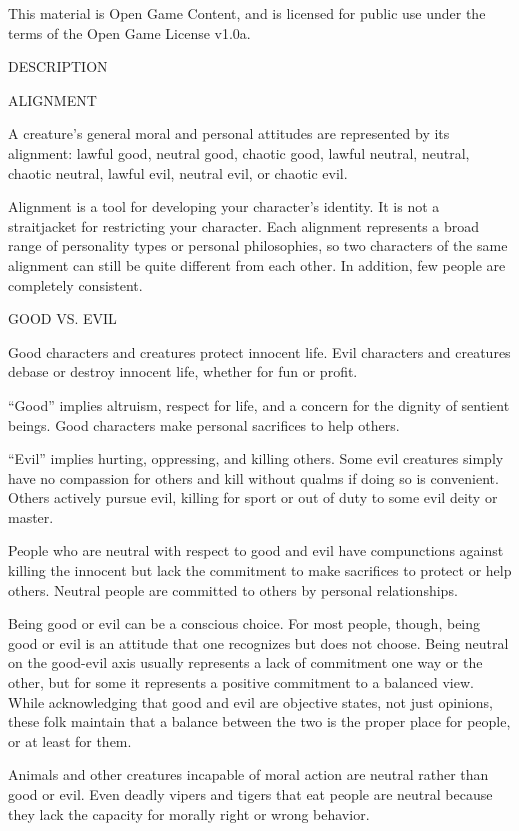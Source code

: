 \documentclass{article}
\begin{document}
This material is Open Game Content, and is licensed for public use under the terms 
of the Open Game License v1.0a.

{\LARGE{}DESCRIPTION}

\vspace{12pt}
{\LARGE{}ALIGNMENT}

A creature's general moral and personal attitudes are represented by its alignment: 
lawful good, neutral good, chaotic good, lawful neutral, neutral, chaotic neutral, 
lawful evil, neutral evil, or chaotic evil.

Alignment is a tool for developing your character's identity. It is not a straitjacket 
for restricting your character. Each alignment represents a broad range of personality 
types or personal philosophies, so two characters of the same alignment can still 
be quite different from each other. In addition, few people are completely consistent.

\vspace{12pt}
GOOD VS. EVIL

Good characters and creatures protect innocent life. Evil characters and creatures 
debase or destroy innocent life, whether for fun or profit.

``Good'' implies altruism, respect for life, and a concern for the dignity of sentient 
beings. Good characters make personal sacrifices to help others.

``Evil'' implies hurting, oppressing, and killing others. Some evil creatures simply 
have no compassion for others and kill without qualms if doing so is convenient. 
Others actively pursue evil, killing for sport or out of duty to some evil deity 
or master. 

People who are neutral with respect to good and evil have compunctions against 
killing the innocent but lack the commitment to make sacrifices to protect or help 
others. Neutral people are committed to others by personal relationships. 

Being good or evil can be a conscious choice. For most people, though, being good 
or evil is an attitude that one recognizes but does not choose. Being neutral on 
the good-evil axis usually represents a lack of commitment one way or the other, 
but for some it represents a positive commitment to a balanced view. While acknowledging 
that good and evil are objective states, not just opinions, these folk maintain 
that a balance between the two is the proper place for people, or at least for 
them.

Animals and other creatures incapable of moral action are neutral rather than good 
or evil. Even deadly vipers and tigers that eat people are neutral because they 
lack the capacity for morally right or wrong behavior.
\end{document}
